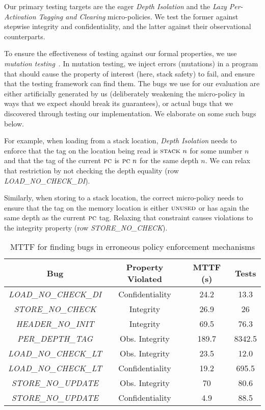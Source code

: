 \documentclass[10pt,conference]{ieeetran}%
\theoremstyle{definition}
\begin{document}
{Our primary testing targets are the eager {\em Depth Isolation}
and the {\em Lazy Per-Activation Tagging and Clearing} micro-policies.
We test the former against stepwise integrity and confidentiality, and
the latter against their observational counterparts.

To ensure the effectiveness of testing against our formal properties, we
use {\em mutation testing}~\cite{JiaH11}. In mutation testing, we inject errors
(mutations) in a program that should cause the property of interest (here,
stack safety) to fail, and ensure that the testing framework can find
them. The bugs we use for our evaluation are either artificially generated
by us (deliberately weakening the micro-policy in ways that we expect
should break its guarantees), or actual bugs that we discovered through
testing our implementation. We elaborate on some such bugs below.

For example, when loading from a stack location, {\em Depth Isolation}
needs to enforce that the tag on the location being read
is $\textsc{stack} ~ n$ for some number $n$ and that the tag of the
current $\textsc{pc}$ is $\textsc{pc} ~ n$ for the same depth $n$. We can relax
that restriction by not checking the depth equality (row {\em
  LOAD\_NO\_CHECK\_DI}).

Similarly, when storing to a stack location, the correct micro-policy
needs to ensure that the tag on the memory location is either
$\textsc{unused}$ or has again the same depth as the current $\textsc{pc}$
tag. Relaxing that constraint causes violations to the integrity
property (row {\em STORE\_NO\_CHECK}).

\begin{table}[]
\centering
\begin{tabular}{c|c|c|c}
  Bug & Property Violated & MTTF (s) & Tests \\
  \hline
      {\em LOAD\_NO\_CHECK\_DI}  & Confidentiality & 24.2 & 13.3 \\
      {\em STORE\_NO\_CHECK} & Integrity & 26.9 & 26 \\
      {\em HEADER\_NO\_INIT} & Integrity & 69.5 & 76.3 \\
  \hline
  \hline
      {\em PER\_DEPTH\_TAG} & Obs. Integrity & 189.7 & 8342.5  \\
      {\em LOAD\_NO\_CHECK\_LT}  & Obs. Integrity & 23.5 & 12.0 \\
      {\em LOAD\_NO\_CHECK\_LT}  & Confidentiality & 19.2 & 695.5 \\
      {\em STORE\_NO\_UPDATE} & Obs. Integrity & 70 & 80.6  \\
      {\em STORE\_NO\_UPDATE} & Confidentiality & 4.9 & 88.5 \\
  \hline
\end{tabular}
\vspace*{1em}
\caption{MTTF for finding bugs in erroneous policy enforcement mechanisms}
\vspace*{-2em}
\label{tab:bug-table}
\end{table}

}
\end{document}
